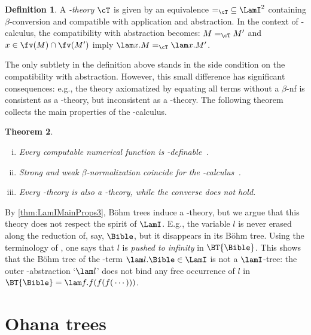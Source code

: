 \documentclass[10pt,a4paper]{amsart}
\newtheorem{theorem}{Theorem}
\theoremstyle{definition}
\newtheorem{definition}[theorem]{Definition}
\newcommand{\bsub}{\begin{enumerate}[(i)]}
\newcommand{\esub}{\end{enumerate}}
\begin{document}
\begin{definition}
A \emph{\lamI-theory} $\cT$ is given by an equivalence $\mathord{=_\cT} \subseteq \LamI^2$ containing $\beta$-conversion and compatible with application and abstraction. 
In the context of \lamI-calculus, 
the compatibility with abstraction becomes: 
$M =_\cT M'$ and $x\in\fv(M)\cap\fv(M')$ 
imply $\lam x.M =_\cT \lam x.M'$.
\end{definition}
The only subtlety in the definition above stands in the side condition on the compatibility with abstraction.
However, this small difference has significant consequences: e.g., the theory axiomatized by equating all terms without a $\beta$-nf is consistent as a \lamI-theory, but inconsistent as a \lam-theory.
The following theorem collects the main properties of the \lamI-calculus.
\begin{theorem}\label{thm:LamIMainProps}\mbox{}
\bsub
\item\label{thm:LamIMainProps1} 
	Every computable numerical function is \lamI-definable~\cite[Thm.~9.2.16]{Bare}.
\item\label{thm:LamIMainProps2} 
	Strong and weak $\beta$-normalization coincide for the \lamI-calculus~\cite[Thm.~11.3.4]{Bare}.
\item\label{thm:LamIMainProps3} 
	Every \lam-theory is also a \lamI-theory, while the converse does not hold. 
\esub
\end{theorem}


By \eqref{thm:LamIMainProps3}, Böhm trees induce a \lamI-theory, but we argue that this theory does not respect the spirit of $\LamI$. 
E.g., the variable $l$ is never erased along the reduction of, say, $\Bible$, but it disappears in its B\"ohm tree. Using the terminology of \cite{Bare}, one says that $l$ is \emph{pushed to infinity} in $\BT{\Bible}$.
This shows that the Böhm tree of the \lamI-term $\lam l.\Bible\in\LamI$ is not a $\lamI$-tree: the outer \lam-abstraction `$\lam l$' does not bind any free occurrence of $l$ in $\BT{\Bible} = \lam f.f(f(f(\,\cdots)))$.


\section{Ohana trees}\label{sec:MemTrees}
\end{document}
